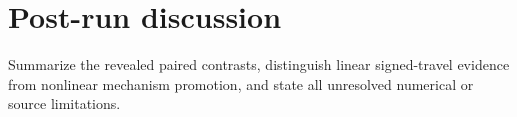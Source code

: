 \section*{Post-run discussion}
Summarize the revealed paired contrasts, distinguish linear signed-travel evidence from nonlinear mechanism promotion, and state all unresolved numerical or source limitations.
